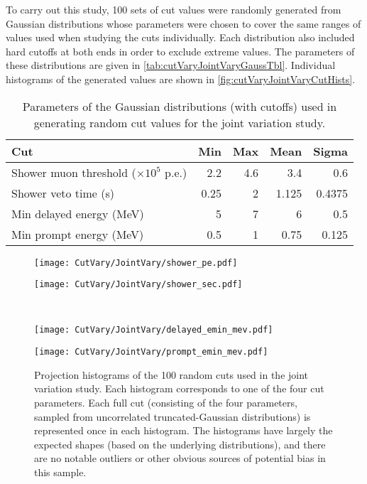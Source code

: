 \documentclass[../thesis.tex]{subfiles}
\begin{document}
To carry out this study, 100 sets of cut values were randomly generated from Gaussian distributions whose parameters were chosen to cover the same ranges of values used when studying the cuts individually. Each distribution also included hard cutoffs at both ends in order to exclude extreme values. The parameters of these distributions are given in \autoref{tab:cutVaryJointVaryGaussTbl}. Individual histograms of the generated values are shown in \autoref{fig:cutVaryJointVaryCutHists}.

\begin{table}[ht]
  \begin{tabular}{lrrrr}
    \toprule
    Cut & Min & Max & Mean & Sigma \\
    \midrule
    Shower muon threshold ($\times 10^5$ p.e.) & 2.2 & 4.6 & 3.4 & 0.6\\
    Shower veto time (s) & 0.25 & 2 & 1.125 & 0.4375\\
    Min delayed energy (MeV) & 5 & 7 & 6 & 0.5\\
    Min prompt energy (MeV) & 0.5 & 1 & 0.75 & 0.125\\
    \bottomrule
  \end{tabular}
  \caption{Parameters of the Gaussian distributions (with cutoffs) used in generating random cut values for the joint variation study.}
  \label{tab:cutVaryJointVaryGaussTbl}
\end{table}

\begin{figure}[h]
  \begin{minipage}{0.5\linewidth}%
    \texttt{[image: CutVary/JointVary/shower\_pe.pdf]}%
  \end{minipage}%
  \begin{minipage}{0.5\linewidth}%
    \texttt{[image: CutVary/JointVary/shower\_sec.pdf]}%
  \end{minipage}\\%
  \begin{minipage}{0.5\linewidth}%
    \texttt{[image: CutVary/JointVary/delayed\_emin\_mev.pdf]}%
  \end{minipage}%
  \begin{minipage}{0.5\linewidth}%
    \texttt{[image: CutVary/JointVary/prompt\_emin\_mev.pdf]}%
  \end{minipage}%
  \caption{Projection histograms of the 100 random cuts used in the joint variation study. Each histogram corresponds to one of the four cut parameters. Each full cut (consisting of the four parameters, sampled from uncorrelated truncated-Gaussian distributions) is represented once in each histogram. The histograms have largely the expected shapes (based on the underlying distributions), and there are no notable outliers or other obvious sources of potential bias in this sample.}
  \label{fig:cutVaryJointVaryCutHists}
\end{figure}
\end{document}
